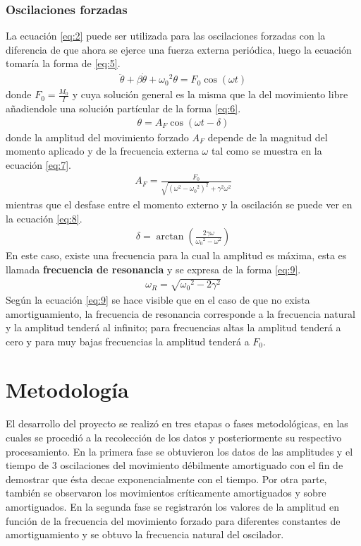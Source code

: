 \documentclass[spanish,notitlepage,letterpaper, 12pt]{article}
\begin{document}
\subsubsection{Oscilaciones forzadas}
La ecuación \eqref{eq:2} puede ser utilizada para las oscilaciones forzadas con la diferencia de que ahora se ejerce una fuerza externa periódica, luego la ecuación tomaría la forma de \eqref{eq:5}.
\begin{align}\label{eq:5}
    \ddot{\theta}+\beta\dot{\theta}+{\omega_0}^2\theta=F_0\cos{(\omega t)}
\end{align}
donde $F_0=\frac{M_0}{I}$ y cuya solución general es la misma que la del movimiento libre añadiendole una solución partícular de la forma \eqref{eq:6}.
\begin{align}\label{eq:6}
    \theta=A_F\cos{(\omega t - \delta)}
\end{align}
donde la amplitud del movimiento forzado $A_F$ depende de la magnitud del momento aplicado y de la frecuencia externa $\omega$ tal como se muestra en la ecuación \eqref{eq:7}.
\begin{align}\label{eq:7}
    A_F=\frac{F_0}{\sqrt{(\omega^2-{\omega_0}^2)^2}+\gamma^2\omega^2}
\end{align}
mientras que el desfase entre el momento externo y la oscilación se puede ver en la ecuación \eqref{eq:8}.
\begin{align}\label{eq:8}
    \delta=\arctan{\left(\frac{2\gamma\omega}{{\omega_0}^2-\omega^2}\right)}
\end{align}
En este caso, existe una frecuencia para la cual la amplitud es máxima, esta es llamada \textbf{frecuencia de resonancia} y se expresa de la forma \eqref{eq:9}.
\begin{align}\label{eq:9}
    \omega_R=\sqrt{{\omega_0}^2-2\gamma^2}
\end{align}
Según la ecuación \eqref{eq:9} se hace visible que en el caso de que no exista amortiguamiento, la frecuencia de resonancia corresponde a
la frecuencia natural y la amplitud tenderá al infinito; para frecuencias altas la amplitud
tenderá a cero y para muy bajas frecuencias la amplitud tenderá a $F_0$.
\section{Metodología}
El desarrollo del proyecto se realizó en tres etapas o fases metodológicas, en las
cuales se procedió a la recolección de los datos y posteriormente su respectivo procesamiento.
En la primera fase se obtuvieron los datos de las amplitudes y el tiempo de $3$ oscilaciones
del movimiento débilmente amortiguado con el fin de demostrar que ésta decae
exponencialmente con el tiempo. Por otra parte, también se observaron los movimientos
críticamente amortiguados y sobre amortiguados. En la segunda fase se registrarón los
valores de la amplitud en función de la frecuencia del movimiento forzado para diferentes
constantes de amortiguamiento y se obtuvo la frecuencia natural del oscilador.
\end{document}
